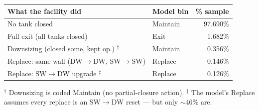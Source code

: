\begin{center}
\small
\renewcommand{\arraystretch}{1.25}
\begin{tabular}{llr}
\toprule
\textbf{What the facility did} & \textbf{Model bin} & \textbf{\% sample} \\
\midrule
No tank closed & Maintain & 97.690\% \\
Full exit (all tanks closed) & Exit & 1.682\% \\
Downsizing (closed some, kept op.) $^{\dagger}$ & Maintain & 0.356\% \\
Replace: same wall (DW$\to$DW, SW$\to$SW) & Replace & 0.146\% \\
Replace: SW$\to$DW upgrade $^{\ddagger}$ & Replace & 0.126\% \\
\bottomrule
\end{tabular}
\end{center}
\vspace{0.1cm}
{\centering\scriptsize $^{\dagger}$ Downsizing is coded Maintain (no partial-closure action). 
$^{\ddagger}$ The model's Replace assumes every replace is an SW$\to$DW reset --- but only $\sim$46\% are.\par}
